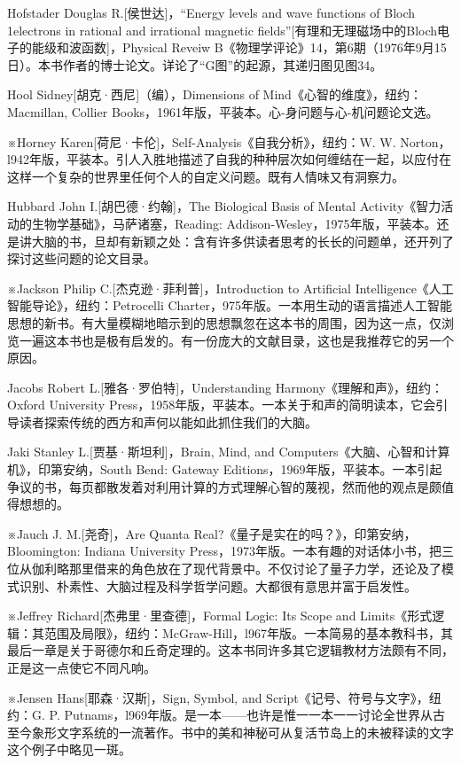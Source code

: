 \documentclass[
  12pt,
  twoside,
  openright,
  oldfontcommands,
]{memoir}
\begin{document}
Hofstader Douglas R.{[}侯世达{]}，``Energy levels and wave functions of Bloch 1electrons in rational and irrational magnetic fields''{[}有理和无理磁场中的Bloch电子的能级和波函数{]}，Physical Reveiw B《物理学评论》14，第6期（1976年9月15日）。本书作者的博士论文。详论了``G图''的起源，其递归图见图34。

Hool Sidney{[}胡克·西尼{]}（编），Dimensions of Mind《心智的维度》，纽约：Macmillan, Collier Books，1961年版，平装本。心-身问题与心-机问题论文选。

※Horney Karen{[}荷尼·卡伦{]}，Self-Analysis《自我分析》，纽约：W. W. Norton，l942年版，平装本。引人入胜地描述了自我的种种层次如何缠结在一起，以应付在这样一个复杂的世界里任何个人的自定义问题。既有人情味又有洞察力。

Hubbard John I.{[}胡巴德·约翰{]}，The Biological Basis of Mental Activity《智力活动的生物学基础》，马萨诸塞，Reading: Addison-Wesley，1975年版，平装本。还是讲大脑的书，旦却有新颖之处：含有许多供读者思考的长长的问题单，还开列了探讨这些问题的论文目录。

※Jackson Philip C.{[}杰克逊·菲利普{]}，Introduction to Artificial Intelligence《人工智能导论》，纽约：Petrocelli Charter，975年版。一本用生动的语言描述人工智能思想的新书。有大量模糊地暗示到的思想飘忽在这本书的周围，因为这一点，仅浏览一遍这本书也是极有启发的。有一份庞大的文献目录，这也是我推荐它的另一个原因。

Jacobs Robert L.{[}雅各·罗伯特{]}，Understanding Harmony《理解和声》，纽约：Oxford University Press，1958年版，平装本。一本关于和声的简明读本，它会引导读者探索传统的西方和声何以能如此抓住我们的大脑。

Jaki Stanley L.{[}贾基·斯坦利{]}，Brain, Mind, and Computers《大脑、心智和计算机》，印第安纳，South Bend: Gateway Editions，1969年版，平装本。一本引起争议的书，每页都散发着对利用计算的方式理解心智的蔑视，然而他的观点是颇值得想想的。

※Jauch J. M.{[}尧奇{]}，Are Quanta Real?《量子是实在的吗？》，印第安纳， Bloomington: Indiana University Press，1973年版。一本有趣的对话体小书，把三位从伽利略那里借来的角色放在了现代背景中。不仅讨论了量子力学，还论及了模式识别、朴素性、大脑过程及科学哲学问题。大都很有意思并富于启发性。

※Jeffrey Richard{[}杰弗里·里查德{]}，Formal Logic: Its Scope and Limits《形式逻辑：其范围及局限》，纽约：McGraw-Hill，l967年版。一本简易的基本教科书，其最后一章是关于哥德尔和丘奇定理的。这本书同许多其它逻辑教材方法颇有不同，正是这一点使它不同凡响。

※Jensen Hans{[}耶森·汉斯{]}，Sign, Symbol, and Script《记号、符号与文字》，纽约：G. P. Putnam\textquotesingle s，l969年版。是一本------也许是惟一一本一一讨论全世界从古至今象形文字系统的一流著作。书中的美和神秘可从复活节岛上的未被释读的文字这个例子中略见一斑。
\end{document}
